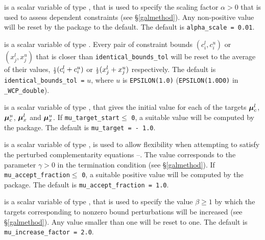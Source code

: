 \documentclass{galahad}
\newcommand{\packagename}{WCP}
\newcommand{\fullpackagename}{\libraryname\_\-\packagename}
\begin{document}
\begin{description}


 is a scalar variable of type \realdp, that is used to
specify the scaling factor $\alpha > 0$ that is used to assess dependent 
constraints (see \S\ref{galmethod}). Any non-positive value will be
reset by the package to the default. The default is {\tt alpha\_scale = 0.01}.

is a scalar variable of type \realdp.
Every pair of constraint bounds 
$(c_{i}^{l}, c_{i}^{u})$ or $(x_{j}^{l}, x_{j}^{u})$
that is closer than {\tt identical\_bounds\_tol} 
will be reset to the average of their values,
${\scriptstyle \frac{1}{2}} (c_{i}^{l} + c_{i}^{u})$ or ${\scriptstyle \frac{1}{2}} (x_{j}^{l} + x_{j}^{u})$
respectively.
The default is {\tt identical\_bounds\_tol =} $u$,
where $u$ is {\tt EPSILON(1.0)} ({\tt EPSILON(1.0D0)} in 
{\tt \fullpackagename\_double}).

 is a scalar variable of type \realdp, 
that gives the initial value for each of the targets
$\bm \mu_c^{l}$, $\bm \mu_c^{u}$, $\bm \mu_x^{l}$ and $\bm \mu_x^{u}$.
If {\tt mu\_target\_start}$\leq$ {\tt 0}, a suitable value will be
computed by the package. The default is {\tt mu\_target = - 1.0}.

 is a scalar variable of type \realdp, 
is used to allow flexibility when attempting to satisfy the perturbed 
complementarity equations --. The value
corresponds to the parameter $\gamma > 0$ in the termination condition
 (see \S\ref{galmethod}).
If {\tt mu\_accept\_fraction}$\leq$ {\tt 0}, a suitable positive value will be
computed by the package. The default is {\tt mu\_accept\_fraction = 1.0}.

 is a scalar variable of type \realdp, 
that is used to specify the value $\beta \geq 1$ by which the targets
corresponding to nonzero bound perturbations will be increased
(see \S\ref{galmethod}). Any value smaller than one will be reset to one.
The default is {\tt mu\_increase\_factor = 2.0}.


\end{description}
\end{document}
